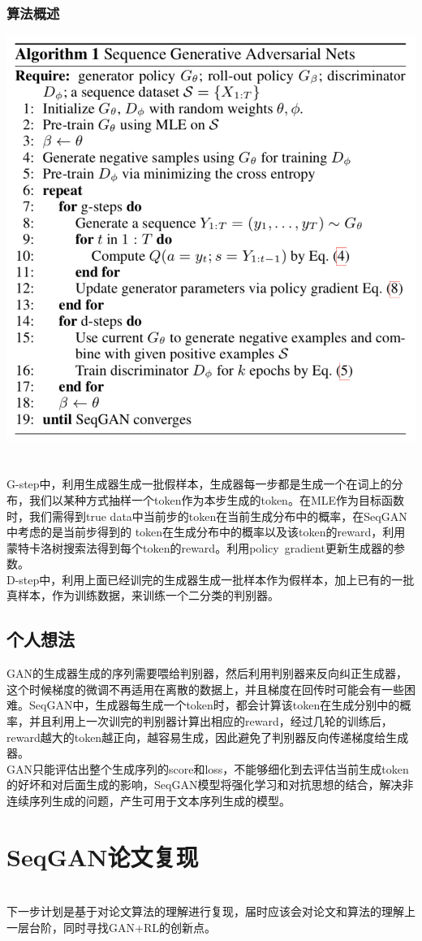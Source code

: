 \documentclass[11pt,a4paper]{ctexart}
\begin{document}
\subsubsection{算法概述}
\includegraphics[scale=1]{8.png}\\\\\\
\noindent G-step中，利用生成器生成一批假样本，生成器每一步都是生成一个在词上的分布，我们以某种方式抽样一个token作为本步生成的token。在MLE作为目标函数时，我们需得到true data中当前步的token在当前生成分布中的概率，在SeqGAN中考虑的是当前步得到的 token在生成分布中的概率以及该token的reward，利用蒙特卡洛树搜索法得到每个token的reward。利用policy gradient更新生成器的参数。\\
D-step中，利用上面已经训完的生成器生成一批样本作为假样本，加上已有的一批真样本，作为训练数据，来训练一个二分类的判别器。
\subsection{个人想法}
\noindent GAN的生成器生成的序列需要喂给判别器，然后利用判别器来反向纠正生成器，这个时候梯度的微调不再适用在离散的数据上，并且梯度在回传时可能会有一些困难。SeqGAN中，生成器每生成一个token时，都会计算该token在生成分别中的概率，并且利用上一次训完的判别器计算出相应的reward，经过几轮的训练后，reward越大的token越正向，越容易生成，因此避免了判别器反向传递梯度给生成器。\\
GAN只能评估出整个生成序列的score和loss，不能够细化到去评估当前生成token的好坏和对后面生成的影响，SeqGAN模型将强化学习和对抗思想的结合，解决非连续序列生成的问题，产生可用于文本序列生成的模型。
\section{SeqGAN论文复现}
\noindent \\下一步计划是基于对论文算法的理解进行复现，届时应该会对论文和算法的理解上一层台阶，同时寻找GAN+RL的创新点。
	
\end{document}

